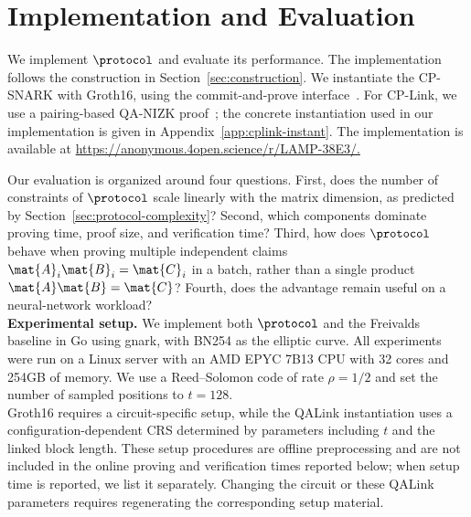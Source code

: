 \section{Implementation and Evaluation}
\label{sec:implementation}

We implement \(\protocol\) and evaluate its performance. The implementation follows the construction in Section~\ref{sec:construction}.  We instantiate the CP-SNARK with Groth16, using the commit-and-prove
interface~\cite{gnark,legosnark}.  For CP-Link, we use a pairing-based QA-NIZK
proof~\cite{qa-nizk}; the concrete instantiation used in our implementation is
given in Appendix~\ref{app:cplink-instant}.  The implementation is available at
\url{https://anonymous.4open.science/r/LAMP-38E3/.}

Our evaluation is organized around four questions.  First, does the number of constraints of \(\protocol\) scale linearly with the matrix dimension, as predicted by Section~\ref{sec:protocol-complexity}?  Second, which components dominate proving time, proof size, and verification time?  Third, how does \(\protocol\) behave when proving multiple independent claims \(\mat{A}_i\mat{B}_i=\mat{C}_i\) in a batch, rather than a single product \(\mat{A}\mat{B}=\mat{C}\)?  Fourth, does the advantage remain useful on a neural-network workload? \\

\noindent\textbf{Experimental setup.}
We implement both \(\protocol\) and the Freivalds baseline in Go using gnark, with BN254 as the elliptic curve.  All experiments were run on a Linux server with an AMD EPYC 7B13 CPU with 32 cores and 254GB of memory.  We use a Reed--Solomon code of rate \(\rho=1/2\) and set the number of sampled positions to \(t=128\).\\

Groth16 requires a circuit-specific setup, while the QALink instantiation uses
a configuration-dependent CRS determined by parameters including \(t\) and the
linked block length. These setup procedures are offline preprocessing and are
not included in the online proving and verification times reported below; when
setup time is reported, we list it separately. Changing the circuit or these
QALink parameters requires regenerating the corresponding setup material.\\





